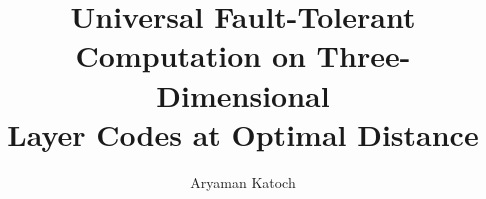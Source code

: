\documentclass[aps,prx,reprint,superscriptaddress,nofootinbib,floatfix,longbibliography]{revtex4-2}
\theoremstyle{definition}
\begin{document}
\title{Universal Fault-Tolerant Computation on Three-Dimensional\\ Layer Codes at Optimal Distance}
\author{Aryaman Katoch}

\end{document}
